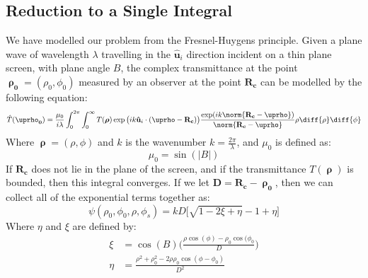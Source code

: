 \documentclass[crop=false,class=book,oneside]{standalone}
\begin{document}
        \subsection{Reduction to a Single Integral}
            We have modelled our problem from the
            Fresnel-Huygens principle. Given a plane wave of
            wavelength $\lambda$ travelling in the
            $\mathbf{\hat{u}}_{i}$ direction incident on a thin
            plane screen, with plane angle $B$,
            the complex transmittance at the point
            $\boldsymbol{\uprho_{0}}=(\rho_{0},\phi_{0})$ measured
            by an observer at the point $\mathbf{R_{c}}$ can be
            modelled by the following equation:
            \begin{equation}
                \hat{T}(\boldsymbol{\uprho_{0}})
                =\frac{\mu_{0}}{i\lambda}
                    \int_{0}^{2\pi}\int_{0}^{\infty}
                    T(\boldsymbol{\rho})
                    \exp\big(ik\mathbf{\hat{u}}_{i}\cdot
                        (\boldsymbol{\uprho}-\mathbf{R_{c}})\big)
                    \frac{\exp(ik
                          \norm{\mathbf{R_{c}}-\boldsymbol{\uprho}})}
                         {\norm{\mathbf{R_{c}}-\boldsymbol{\uprho}}}
                    \rho\diff{\rho}\diff{\phi}
            \end{equation}
            Where $\boldsymbol{\uprho}=(\rho,\phi)$ and $k$
            is the wavenumber $k=\frac{2\pi}{\lambda}$, and
            $\mu_{0}$ is defined as:
            \begin{equation}
                \mu_{0}=\sin(|B|)
            \end{equation}
            If $\mathbf{R_{c}}$ does not lie in the plane of the
            screen, and if the transmittance
            $T(\boldsymbol{\uprho})$ is bounded, then this
            integral converges. If we let
            $\mathbf{D}=\mathbf{R_{c}}-\boldsymbol{\uprho_{0}}$,
            then we can collect all of the exponential terms
            together as:
            \begin{equation}
                \psi(\rho_{0},\phi_{0},\rho,\phi_{s})
                =kD\Big[\sqrt{1-2\xi+\eta}-1+\eta\Big]
            \end{equation}
            Where $\eta$ and $\xi$ are defined by:
            \begin{subequations}
                \begin{align}
                    \xi&=\cos(B)\Big(
                    \frac{\rho\cos(\phi)-\rho_{0}\cos(\phi_{0}}{D}
                    \Big)\\
                    \eta&=\frac{\rho^{2}+\rho_{0}^{2}-2\rho\rho_{0}
                               \cos(\phi-\phi_{0})}{D^{2}}
                \end{align}
            \end{subequations}
\end{document}
